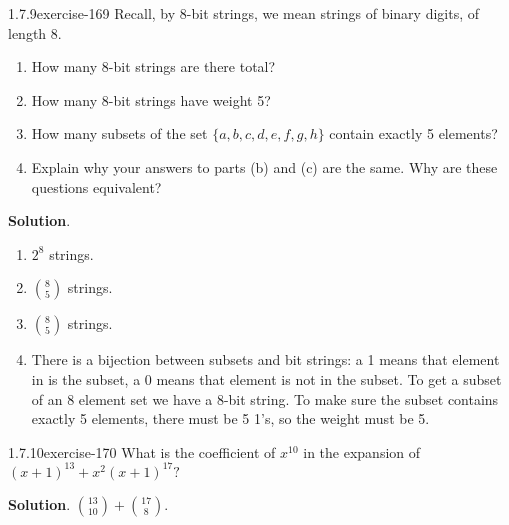 \documentclass[twoside,11pt,]{book}
\numberwithin{equation}{chapter}
\begin{document}
\begin{divisionsolution}{1.7.9}{}{exercise-169}%
\hypertarget{p-2775}{}%
Recall, by \(8\)-bit strings, we mean strings of binary digits, of length 8.\leavevmode%
\begin{enumerate}[label=(\alph*)]
\item\hypertarget{li-1644}{}\hypertarget{p-2776}{}%
How many \(8\)-bit strings are there total?%
\item\hypertarget{li-1645}{}\hypertarget{p-2778}{}%
How many \(8\)-bit strings have weight 5?%
\item\hypertarget{li-1646}{}\hypertarget{p-2780}{}%
How many subsets of the set \(\{a,b,c,d,e,f,g,h\}\) contain exactly 5 elements?%
\item\hypertarget{li-1647}{}\hypertarget{p-2782}{}%
Explain why your answers to parts (b) and (c) are the same. Why are these questions equivalent?%
\end{enumerate}
%
\par\smallskip%
\noindent\textbf{Solution}.\quad%
\hypertarget{p-2783}{}%
\leavevmode%
\begin{enumerate}[label=(\alph*)]
\item\hypertarget{li-1648}{}\hypertarget{p-2784}{}%
\(2^8\) strings.%
\item\hypertarget{li-1649}{}\hypertarget{p-2785}{}%
\({8 \choose 5}\) strings.%
\item\hypertarget{li-1650}{}\hypertarget{p-2786}{}%
\({8 \choose 5}\) strings.%
\item\hypertarget{li-1651}{}\hypertarget{p-2787}{}%
There is a bijection between subsets and bit strings: a 1 means that element in is the subset, a 0 means that element is not in the subset. To get a subset of an 8 element set we have a 8-bit string. To make sure the subset contains exactly 5 elements, there must be 5 1's, so the weight must be 5.%
\end{enumerate}
%
\end{divisionsolution}%
\begin{divisionsolution}{1.7.10}{}{exercise-170}%
\hypertarget{p-2791}{}%
What is the coefficient of \(x^{10}\) in the expansion of \((x+1)^{13} + x^2(x+1)^{17}\text{?}\)%
\par\smallskip%
\noindent\textbf{Solution}.\quad%
\hypertarget{p-2793}{}%
\({13 \choose 10} + {17 \choose 8}\text{.}\)%
\end{divisionsolution}%
\end{document}
